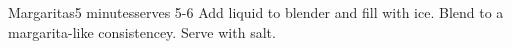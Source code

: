 \begin{recipe}{Margaritas}{5 minutes}{serves 5-6}
Add liquid to blender and fill with ice. Blend to a margarita-like
consistencey. Serve with salt.
\end{recipe}
